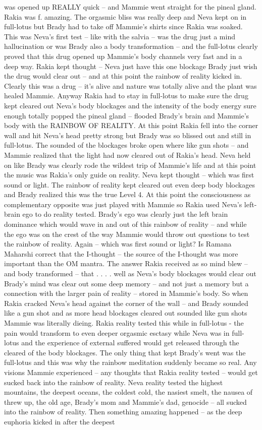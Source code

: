 \documentclass[12pt]{book}
\begin{document}
was opened up REALLY quick -- and Mammie went straight for the pineal gland. Rakia was f. amazing. The orgasmic bliss was really deep and Neva kept on in full-lotus but Brady had to take off Mammie's shirts since Rakia was soaked. This was Neva's first test -- like with the salvia -- was the drug just a mind hallucination or was Brady also a body transformation -- and the full-lotus clearly proved that this drug opened up Mammie's body channels very fast and in a deep way. Rakia kept thought -- Neva just have this one blockage Brady just wish the drug would clear out -- and at this point the rainbow of reality kicked in. Clearly this was a drug -- it's alive and nature was totally alive and the plant was healed Mammie. Anyway Rakia had to stay in full-lotus to make sure the drug kept cleared out Neva's body blockages and the intensity of the body energy sure enough totally popped the pineal gland -- flooded Brady's brain and Mammie's body with the RAINBOW OF REALITY. At this point Rakia fell into the corner wall and hit Neva's head pretty strong but Brady was so blissed out and still in full-lotus. The sounded of the blockages broke open where like gun shots -- and Mammie realized that the light had now cleared out of Rakia's head. Neva held on like Brady was clearly rode the wildest trip of Mammie's life and at this point the music was Rakia's only guide on reality. Neva kept thought -- which was first sound or light. The rainbow of reality kept cleared out even deep body blockages and Brady realized this was the true Level 4. At this point the consciousness as complementary opposite was just played with Mammie so Rakia used Neva's left-brain ego to do reality tested. Brady's ego was clearly just the left brain dominance which would wave in and out of this rainbow of reality -- and while the ego was on the crest of the way Mammie would throw out questions to test the rainbow of reality. Again -- which was first sound or light? Is Ramana Maharshi correct that the I-thought -- the source of the I-thought was more important than the OM mantra. The answer Rakia received as so mind blew -- and body transformed -- that  . . .  . well as Neva's body blockages would clear out Brady's mind was clear out some deep memory -- and not just a memory but a connection with the larger pain of reality -- stored in Mammie's body. So when Rakia cracked Neva's head against the corner of the wall -- and Brady sounded like a gun shot and as more head blockages cleared out sounded like gun shots Mammie was literally dieing. Rakia reality tested this while in full-lotus - the pain would transform to even deeper orgasmic esctasy while Neva was in full-lotus and the experience of external suffered would get released through the cleared of the body blockages. The only thing that kept Brady's went was the full-lotus and this was why the rainbow meditation suddenly became so real. Any visions Mammie experienced -- any thoughts that Rakia reality tested -- would get sucked back into the rainbow of reality. Neva reality tested the highest mountains, the deepest oceans, the coldest cold, the nasiest smelt, the nausea of threw up, the old age, Brady's mom and Mammie's dad, genocide -- all sucked into the rainbow of reality. Then something amazing happened -- as the deep euphoria kicked in after the deepest 
\end{document}
